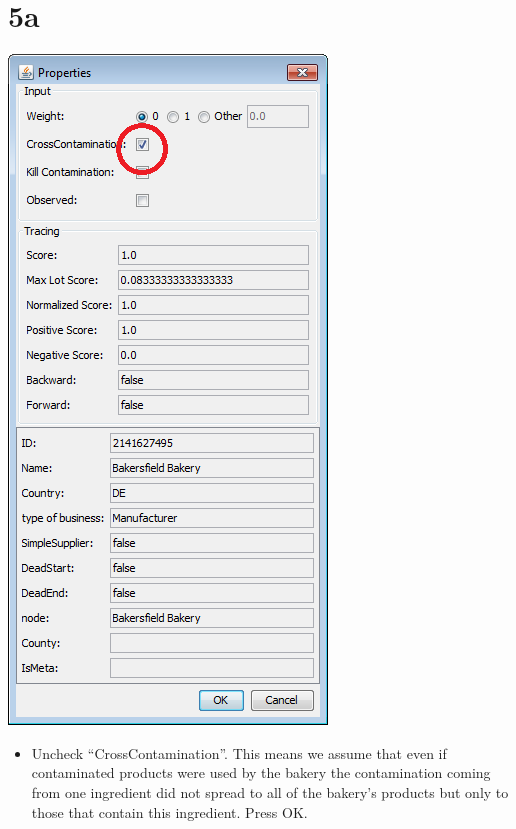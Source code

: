 \documentclass[10pt]{beamer}
\begin{document}
\section{5a}
\begin{frame}
	\begin{center}
  		\includegraphics[height=0.6\textheight]{5a.png}
	\end{center}
	\begin{itemize}
		\item Uncheck ``CrossContamination''. This means we assume that even if contaminated products were used by the bakery the contamination coming from one ingredient did not spread to all of the bakery’s products but only to those that contain this ingredient. Press OK.
	\end{itemize}
\end{frame}
\end{document}
